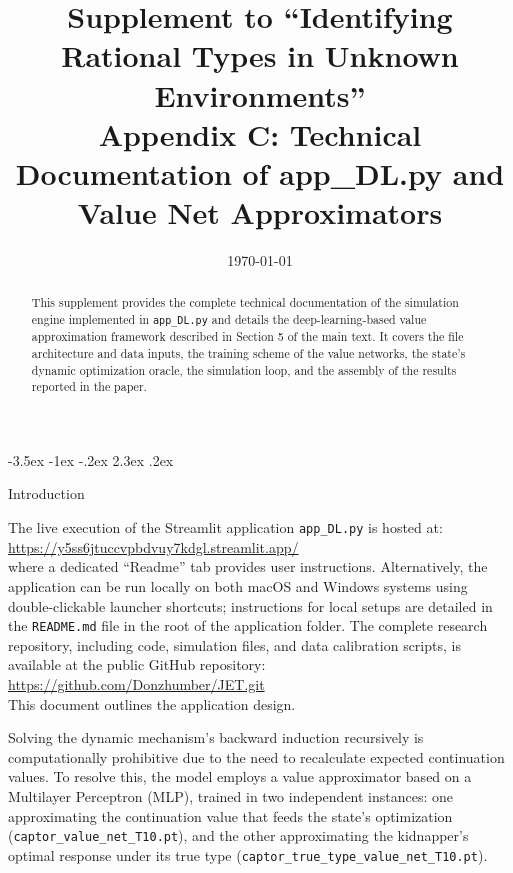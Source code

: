 \documentclass[12pt]{article}
\makeatletter
\newcommand{\pyfile}[1]{\texttt{#1}}
\numberwithin{equation}{section}
\numberwithin{table}{section}
\renewcommand\section{\@startsection {section}{1}{\z@}%
                                   {-3.5ex \@plus -1ex \@minus -.2ex}%
                                   {2.3ex \@plus.2ex}%
                                   {\normalfont\Large\bfseries\raggedright}}
\makeatother
\begin{document}
\title{Supplement to ``Identifying Rational Types in Unknown Environments''\\
Appendix C: Technical Documentation of app\_DL.py and Value Net Approximators}
\author{}
\date{\today}
\maketitle

\begin{abstract}
\singlespacing
This supplement provides the complete technical documentation of the simulation engine implemented in \pyfile{app\_DL.py} and details the deep-learning-based value approximation framework described in Section 5 of the main text. It covers the file architecture and data inputs, the training scheme of the value networks, the state's dynamic optimization oracle, the simulation loop, and the assembly of the results reported in the paper.
\end{abstract}

\section{Introduction}

The live execution of the Streamlit application \pyfile{app\_DL.py} is hosted at:\\
\url{https://y5ss6jtuccvpbdvuy7kdgl.streamlit.app/}\\
where a dedicated ``Readme'' tab provides user instructions. Alternatively, the application can be run locally on both macOS and Windows systems using double-clickable launcher shortcuts; instructions for local setups are detailed in the \texttt{README.md} file in the root of the application folder. The complete research repository, including code, simulation files, and data calibration scripts, is available at the public GitHub repository:\\
\url{https://github.com/Donzhumber/JET.git}\\
This document outlines the application design.

Solving the dynamic mechanism's backward induction recursively is computationally prohibitive due to the need to recalculate expected continuation values. To resolve this, the model employs a value approximator based on a Multilayer Perceptron (MLP), trained in two independent instances: one approximating the continuation value that feeds the state's optimization (\pyfile{captor\_value\_net\_T10.pt}), and the other approximating the kidnapper's optimal response under its true type (\pyfile{captor\_true\_type\_value\_net\_T10.pt}).
\end{document}
